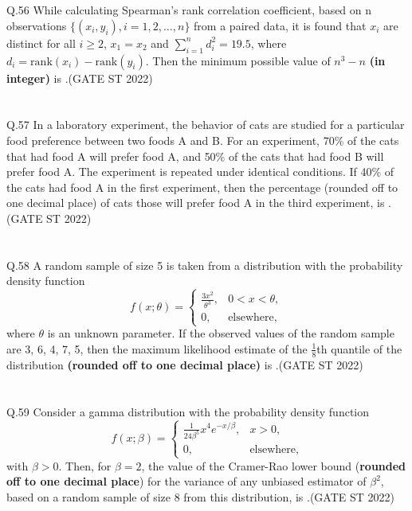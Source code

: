 \documentclass[journal,12pt,onecolumn]{IEEEtran}
\theoremstyle{remark}
\begin{document}
\\
\\
Q.56 While calculating Spearman’s rank correlation coefficient, based on n observations $\{(x_i , y_i), i = 1, 2, \dots, n\}$ from a paired data, it is found that $x_i$ are distinct for all $i \ge 2$, $x_1 = x_2$ and $\sum_{i=1}^{n}d^2_i = 19.5$, where $d_i = \text{rank}(x_i) - \text{rank}(y_i)$. Then the minimum possible value of $n^3 - n$ \textbf{(in integer)} is \underline{\hspace{2cm}}.\hfill (GATE ST 2022)\\
\\
\\
Q.57 In a laboratory experiment, the behavior of cats are studied for a particular food preference between two foods A and B. For an experiment, 70\% of the cats that had food A will prefer food A, and 50\% of the cats that had food B will prefer food A. The experiment is repeated under identical conditions. If 40\% of the cats had food A in the first experiment, then the percentage (rounded off to one decimal place) of cats those will prefer food A in the third experiment, is \underline{\hspace{2cm}}.\hfill (GATE ST 2022)\\
\\
\\
Q.58 A random sample of size 5 is taken from a distribution with the probability density function
\[
f(x; \theta) =
\begin{cases}
	\frac{3x^2}{\theta^3}, & 0 < x < \theta, \\
	0, & \text{elsewhere},
\end{cases}
\]
where $\theta$ is an unknown parameter. If the observed values of the random sample are 3, 6, 4, 7, 5, then the maximum likelihood estimate of the $\frac{1}{8}$th quantile of the distribution \textbf{(rounded off to one decimal place)} is \underline{\hspace{2cm}}.\hfill (GATE ST 2022)\\
\\
\\
Q.59 Consider a gamma distribution with the probability density function 
\[
f(x; \beta) = \begin{cases}
	\frac{1}{24\beta^5}x^4 e^{-x/\beta}, & x > 0,\\
	0, & \text{elsewhere},
\end{cases}
\]
with $\beta > 0$. Then, for $\beta = 2$, the value of the Cramer-Rao lower bound (\textbf{rounded off to one decimal place}) for the variance of any unbiased estimator of $\beta^2$, based on a random sample of size 8 from this distribution, is \underline{\hspace{2cm}}.\hfill (GATE ST 2022)\\
\end{document}
